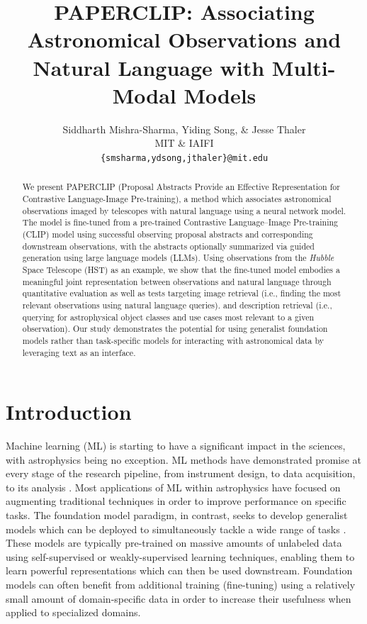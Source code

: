\documentclass{article} %
\title{\textsc{PAPERCLIP}: Associating Astronomical Observations and Natural Language with Multi-Modal Models}
\author{Siddharth Mishra-Sharma, Yiding Song, \& Jesse Thaler \\
MIT \& IAIFI \\
\texttt{\{smsharma,ydsong,jthaler\}@mit.edu}
}
\newcommand{\hubble}{\emph{Hubble}\xspace}
\begin{document}
\maketitle

\begin{abstract}
   We present PAPERCLIP (Proposal Abstracts Provide an Effective Representation for Contrastive Language-Image Pre-training), a method which associates astronomical observations imaged by telescopes with natural language using a neural network model. The model is fine-tuned from a pre-trained Contrastive Language–Image Pre-training (CLIP) model using successful observing proposal abstracts and corresponding downstream observations, with the abstracts optionally summarized via guided generation using large language models (LLMs). Using observations from the \hubble Space Telescope (HST) as an example, we show that the fine-tuned model embodies a meaningful joint representation between observations and natural language through quantitative evaluation as well as tests targeting image retrieval (i.e., finding the most relevant observations using natural language queries).
  and description retrieval (i.e., querying for astrophysical object classes and use cases most relevant to a given observation). 
  Our study demonstrates the potential for using generalist foundation models rather than task-specific models for interacting with astronomical data by leveraging text as an interface.
\end{abstract}

\section{Introduction}
\label{sec:intro}

Machine learning (ML) is starting to have a significant impact in the sciences, with astrophysics being no exception.
%
ML methods have demonstrated promise at every stage of the research pipeline, from instrument design, to data acquisition, to its analysis \citep{huertas2022dawes}.
%
Most applications of ML within astrophysics have focused on augmenting traditional techniques in order to improve performance on specific tasks.
%
The {foundation model} paradigm, in contrast, seeks to develop generalist models which can be deployed to simultaneously tackle a wide range of tasks \citep{bommasani2021opportunities}.
%
These models are typically pre-trained on massive amounts of unlabeled data using self-supervised or weakly-supervised learning techniques, enabling them to learn powerful representations which can then be used downstream.
%
Foundation models can often benefit from additional training ({fine-tuning}) using a relatively small amount of domain-specific data in order to increase their usefulness when applied to specialized domains.
\end{document}
